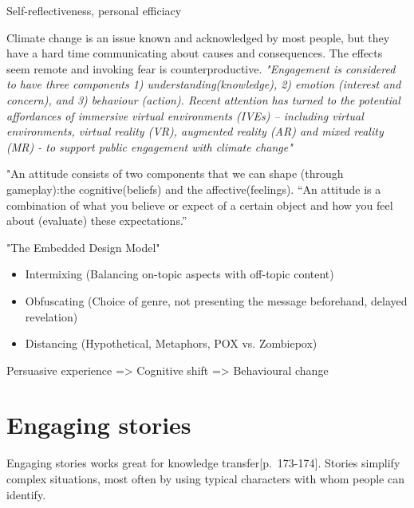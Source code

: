 Self-reflectiveness, personal efficiacy
    
    Climate change is an issue known and acknowledged by most people, but they have a hard time communicating about causes and consequences. The effects seem remote and invoking fear is counterproductive. \textit{"Engagement is considered to have three components 1) understanding(knowledge), 2) emotion (interest and concern), and 3) behaviour (action). Recent attention has turned to the potential affordances of immersive virtual environments (IVEs) – including virtual environments, virtual reality (VR), augmented reality (AR) and mixed reality (MR) - to support public engagement with climate change"}\cite{vrEngagementClimateChange}
    
    "An attitude consists of two components that we can shape (through gameplay):the cognitive(beliefs) and the affective(feelings). “An attitude is a combination of what you believe or expect of a certain object and how you feel about (evaluate) these expectations.”\cite{persuasiveGameplay}
    
    
    "The Embedded Design Model"\cite{embeddedDesignModel}
    \begin{itemize}
        \item Intermixing (Balancing on-topic aspects with off-topic content)
        \item Obfuscating (Choice of genre, not presenting the message beforehand, delayed revelation)
        \item Distancing (Hypothetical, Metaphors, POX vs. Zombiepox)
    \end{itemize}
    \cite{transformationalFramework}
    
    Persuasive experience => Cognitive shift => Behavioural change
    \cite{transformativeVR}


\section{Engaging stories}
    Engaging stories works great for knowledge transfer\citep{engagingStoryFundamentals}[p.~173-174].
    Stories simplify complex situations, most often by using typical characters with whom people can identify\cite{engagingStoryFundamentals}.
    
